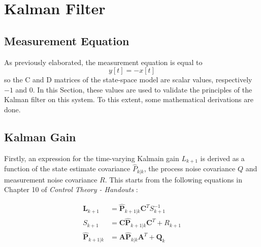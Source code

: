 \documentclass[a4paper,kul]{kulakarticle} %
\begin{document}
\newpage
\section{Kalman Filter}
\subsection{Measurement Equation}
As previously elaborated, the measurement equation is equal to 
\begin{equation}
	y[t] = -x[t]
	\label{eq:eq7}
\end{equation}
so the C and D matrices of the state-space model are scalar values, respectively $-1$ and $0$. In this Section, these values are used to validate the principles of the Kalman filter on this system. To this extent, some mathematical derivations are done. 

\subsection{Kalman Gain}
\label{subsec:kalman_gain}
Firstly, an expression for the time-varying Kalmain gain $L_{k+1}$ is derived as a function of the state estimate covariance $\hat{P}_{k|k}$, the process noise covariance $Q$ and measurement noise covariance $R$. This starts from the following equations in Chapter 10 of \textit{Control Theory - Handouts} \cite{slidescontroltheory}:

\begin{align}
	\mathbf{L}_{k+1} &= \mathbf{\hat{P}}_{k+1|k} \mathbf{C}^T S_{k+1}^{-1} \label{eq:eq8}\\
	S_{k+1} &= \mathbf{C \hat{P}}_{k+1|k} \mathbf{C}^T + R_{k+1} \label{eq:eq9}\\
	\mathbf{\hat{P}}_{k+1|k} &= \mathbf{A} \mathbf{\hat{P}}_{k|k} \mathbf{A}^T + \mathbf{Q}_k \label{eq:eq10}
\end{align}
\end{document}

